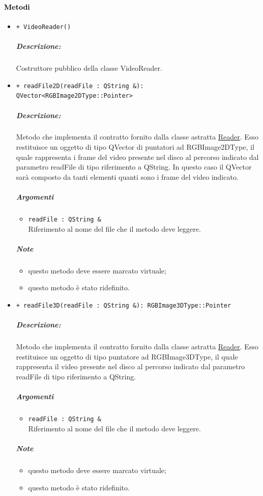 \paragraph{\textcolor{black}{Metodi\\}}
	\begin{itemize}
		\item \color{blue}\verb!+ VideoReader()!
		\color{black}
		\subparagraph{Descrizione:}Costruttore pubblico della classe VideoReader. \\

		\item \color{blue}\verb!+ readFile2D(readFile : QString &): QVector<RGBImage2DType::Pointer>!
		\color{black}
		\subparagraph{Descrizione:} Metodo che implementa il contratto fornito dalla classe astratta \hyperref[spereader]{Reader}.  Esso restituisce un oggetto di tipo QVector di puntatori ad  RGBImage2DType, il quale rappresenta i frame del video presente nel disco al percorso indicato dal parametro readFile di tipo riferimento a QString. In questo caso il QVector sarà composto da tanti elementi quanti sono i frame del video indicato.

		\subparagraph{Argomenti}
			\begin{itemize}
				\item \color{RoyalPurple}\verb!readFile : QString &! \\ 
				\color{black}Riferimento al nome del file che il metodo deve leggere.
			\end{itemize}

		\subparagraph{Note}
			\begin{itemize}
				\item questo metodo deve essere marcato virtuale;
				\item questo metodo è stato ridefinito.
			\end{itemize}
 
		\item \color{blue}\verb!+ readFile3D(readFile : QString &): RGBImage3DType::Pointer!
		\color{black}
		\subparagraph{Descrizione:} Metodo che implementa il contratto fornito dalla classe astratta \hyperref[spereader]{Reader}. Esso restituisce un oggetto di tipo puntatore ad  RGBImage3DType, il quale rappresenta il video presente nel disco al percorso indicato dal parametro readFile di tipo riferimento a QString.

		\subparagraph{Argomenti}
			\begin{itemize}
				\item \color{RoyalPurple}\verb!readFile : QString &! \\ 
				\color{black}Riferimento al nome del file che il metodo deve leggere.
			\end{itemize}

		\subparagraph{Note}
			\begin{itemize}
				\item questo metodo deve essere marcato virtuale;
				\item questo metodo è stato ridefinito.
			\end{itemize}
\end{itemize}
			\color{black}
